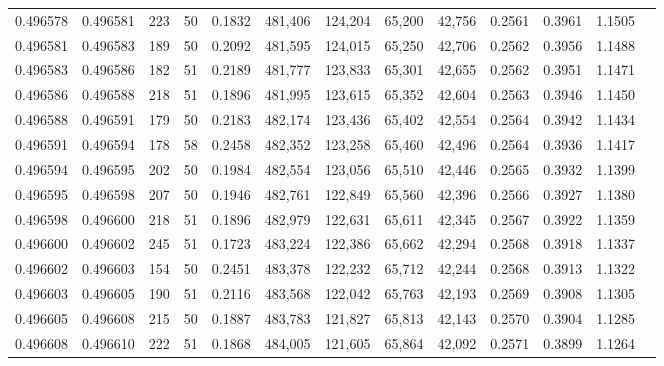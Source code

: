 \begin{tabular}{rrrrrrrrrrrrr}
0.496578 & 0.496581 &   223 &  50 &                                     0.1832 & 481,406 & 124,204 &  65,200 &  42,756 & 0.2561 & 0.3961 & 1.1505 \\
0.496581 & 0.496583 &   189 &  50 &                                     0.2092 & 481,595 & 124,015 &  65,250 &  42,706 & 0.2562 & 0.3956 & 1.1488 \\
0.496583 & 0.496586 &   182 &  51 &                                     0.2189 & 481,777 & 123,833 &  65,301 &  42,655 & 0.2562 & 0.3951 & 1.1471 \\
0.496586 & 0.496588 &   218 &  51 &                                     0.1896 & 481,995 & 123,615 &  65,352 &  42,604 & 0.2563 & 0.3946 & 1.1450 \\
0.496588 & 0.496591 &   179 &  50 &                                     0.2183 & 482,174 & 123,436 &  65,402 &  42,554 & 0.2564 & 0.3942 & 1.1434 \\
0.496591 & 0.496594 &   178 &  58 &                                     0.2458 & 482,352 & 123,258 &  65,460 &  42,496 & 0.2564 & 0.3936 & 1.1417 \\
0.496594 & 0.496595 &   202 &  50 &                                     0.1984 & 482,554 & 123,056 &  65,510 &  42,446 & 0.2565 & 0.3932 & 1.1399 \\
0.496595 & 0.496598 &   207 &  50 &                                     0.1946 & 482,761 & 122,849 &  65,560 &  42,396 & 0.2566 & 0.3927 & 1.1380 \\
0.496598 & 0.496600 &   218 &  51 &                                     0.1896 & 482,979 & 122,631 &  65,611 &  42,345 & 0.2567 & 0.3922 & 1.1359 \\
0.496600 & 0.496602 &   245 &  51 &                                     0.1723 & 483,224 & 122,386 &  65,662 &  42,294 & 0.2568 & 0.3918 & 1.1337 \\
0.496602 & 0.496603 &   154 &  50 &                                     0.2451 & 483,378 & 122,232 &  65,712 &  42,244 & 0.2568 & 0.3913 & 1.1322 \\
0.496603 & 0.496605 &   190 &  51 &                                     0.2116 & 483,568 & 122,042 &  65,763 &  42,193 & 0.2569 & 0.3908 & 1.1305 \\
0.496605 & 0.496608 &   215 &  50 &                                     0.1887 & 483,783 & 121,827 &  65,813 &  42,143 & 0.2570 & 0.3904 & 1.1285 \\
0.496608 & 0.496610 &   222 &  51 &                                     0.1868 & 484,005 & 121,605 &  65,864 &  42,092 & 0.2571 & 0.3899 & 1.1264 \\

\end{tabular}
